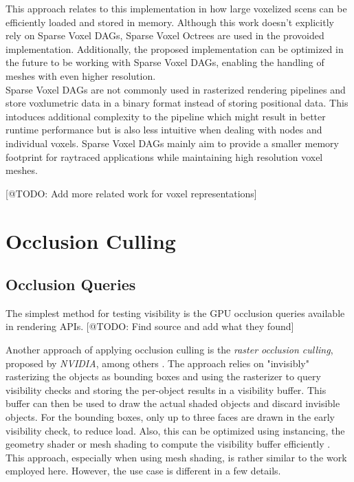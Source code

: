 \noindent
This approach relates to this implementation in how large voxelized scens can be efficiently loaded and stored in 
memory. Although this work doesn't explicitly rely on Sparse Voxel \ac{DAG}s, Sparse Voxel Octrees are used in the 
provoided implementation. Additionally, the proposed implementation can be optimized in the future to be working 
with Sparse Voxel \ac{DAG}s, enabling the handling of meshes with even higher resolution. \\

\noindent
Sparse Voxel \ac{DAG}s are not commonly used in rasterized rendering pipelines and store voxlumetric data in a binary 
format instead of storing positional data. This intoduces additional complexity to the pipeline which might result in 
better runtime performance but is also less intuitive when dealing with nodes and individual voxels. Sparse Voxel 
\ac{DAG}s mainly aim to provide a smaller memory footprint for raytraced applications while maintaining high resolution 
voxel meshes.


[@TODO: Add more related work for voxel representations]

\section{Occlusion Culling}

\subsection*{Occlusion Queries}

The simplest method for testing visibility is the \ac{GPU} occlusion queries available in rendering \ac{API}s.
[@TODO: Find source and add what they found]

Another approach of applying occlusion culling is the \emph{raster occlusion culling}, proposed by \emph{NVIDIA}, 
among others \cite{NVIDIAGLOC2016}. The approach relies on "invisibly" rasterizing the objects as bounding boxes 
and using the rasterizer to query visibility checks and storing the per-object results in a visibility buffer. 
This buffer can then be used to draw the actual shaded objects and discard invisible objects. For the bounding 
boxes, only up to three faces are drawn in the early visibility check, to reduce load. Also, this can be optimized 
using instancing, the geometry shader or mesh shading to compute the visibility buffer efficiently 
\cite{NVIDIAGLOC2016}. This approach, especially when using mesh shading, is rather similar to the work employed 
here. However, the use case is different in a few details.


